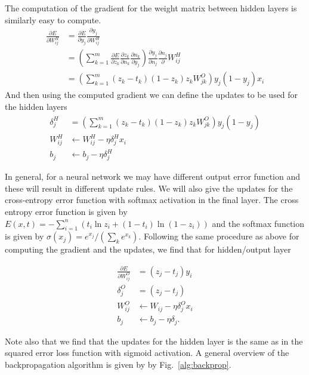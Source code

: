 \documentclass[conference]{IEEEtran}
\begin{document}
The computation of the gradient for the weight matrix between hidden layers is similarly easy to compute.
\begin{equation}
\begin{split}
\frac{\partial E}{\partial W^H_{ij}} &= \frac{\partial E}{\partial y_j}\frac{\partial y_j}{\partial W^H_{ij}} \\
																	 &=\left(\sum_{k=1}^m \frac{\partial E}{\partial z_k}\frac{\partial z_k}{\partial n_k}\frac{\partial n_k}{\partial y_j} \right)\frac{\partial y_j}{\partial n_j}\frac{\partial n_j}\partial W_{ij}^H\\
																	 &=\left(\sum_{k=1}^m (z_k - t_k)(1-z_k)z_kW_{jk}^O \right)y_j(1-y_j)x_i
\end{split}
\label{}
\end{equation}
And then using the computed gradient we can define the updates to be used for the hidden layers
\begin{equation}
\begin{split}
\delta^H_j &= \left(\sum_{k=1}^m (z_k - t_k)(1-z_k)z_kW_{jk}^O \right)y_j(1-y_j) \\
W^H_{ij} &\leftarrow W^H_{ij} - \eta\delta^H_jx_i \\
b_j &\leftarrow b_j - \eta\delta^H_j
\end{split}
\end{equation}

In general, for a neural network we may have different output error function and these will result in different update rules. We will also give the updates
for the cross-entropy error function with softmax activation in the final layer.
The cross entropy error function is given by $E(x,t) = -\sum_{i=1}^n \left(t_i\ln z_i + (1-t_i)\ln(1-z_i)\right)$
and the softmax function is given by $\sigma(x_j) = e^{x_j} /(\sum_k e^{x_k})$. Following the same procedure as above
for computing the gradient and the updates, we find that for hidden/output layer

\begin{equation}
\begin{split}
\frac{\partial E}{\partial W^O_{ij}} &= (z_j - t_j)y_i \\
\delta^O_j &= (z_j-t_j) \\
W^O_{ij} &\leftarrow W_{ij} - \eta \delta^O_j x_i \\
b_j &\leftarrow b_j - \eta\delta_j.
\end{split}
\end{equation}

Note also that we find that the updates for the hidden layer is the same as in the squared error loss function with sigmoid activation. A general overview of the backpropagation algorithm is given by by Fig.~\ref{alg:backprop}.
\end{document}
